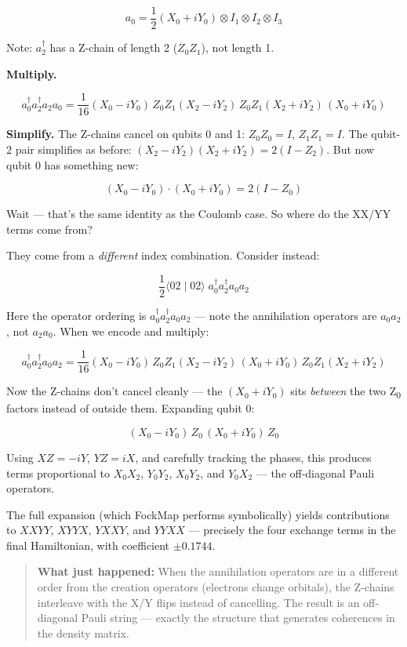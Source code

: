 \documentclass[
  11pt,
  oneside]{book}
\begin{document}
\[a_0 = \frac{1}{2}(X_0 + iY_0) \otimes I_1 \otimes I_2 \otimes I_3\]

Note: \(a_2^\dagger\) has a Z-chain of length 2 (\(Z_0 Z_1\)), not
length 1.

\textbf{Multiply.}

\[a_0^\dagger a_2^\dagger a_2 a_0 = \frac{1}{16}(X_0 - iY_0)\,Z_0 Z_1(X_2 - iY_2)\,Z_0 Z_1(X_2 + iY_2)\,(X_0 + iY_0)\]

\textbf{Simplify.} The Z-chains cancel on qubits 0 and 1:
\(Z_0 Z_0 = I\), \(Z_1 Z_1 = I\). The qubit-2 pair simplifies as before:
\((X_2 - iY_2)(X_2 + iY_2) = 2(I - Z_2)\). But now qubit 0 has something
new:

\[(X_0 - iY_0) \cdot (X_0 + iY_0) = 2(I - Z_0)\]

Wait --- that's the same identity as the Coulomb case. So where do the
XX/YY terms come from?

They come from a \emph{different} index combination. Consider instead:

\[\frac{1}{2}\langle 02 \mid 02\rangle\; a_0^\dagger a_2^\dagger a_0 a_2\]

Here the operator ordering is \(a_0^\dagger a_2^\dagger a_0 a_2\) ---
note the annihilation operators are \(a_0 a_2\), not \(a_2 a_0\). When
we encode and multiply:

\[a_0^\dagger a_2^\dagger a_0 a_2 = \frac{1}{16}(X_0 - iY_0)\,Z_0 Z_1(X_2 - iY_2)\,(X_0 + iY_0)\,Z_0 Z_1(X_2 + iY_2)\]

Now the Z-chains don't cancel cleanly --- the \((X_0 + iY_0)\) sits
\emph{between} the two Z\textsubscript{0} factors instead of outside them. Expanding
qubit 0:

\[(X_0 - iY_0)\,Z_0\,(X_0 + iY_0)\,Z_0\]

Using \(X Z = -iY\), \(Y Z = iX\), and carefully tracking the phases,
this produces terms proportional to \(X_0 X_2\), \(Y_0 Y_2\),
\(X_0 Y_2\), and \(Y_0 X_2\) --- the off-diagonal Pauli operators.

The full expansion (which FockMap performs symbolically) yields
contributions to \(XXYY\), \(XYYX\), \(YXXY\), and \(YYXX\) ---
precisely the four exchange terms in the final Hamiltonian, with
coefficient \(\pm 0.1744\).

\begin{quote}
\textbf{What just happened:} When the annihilation operators are in a
different order from the creation operators (electrons change orbitals),
the Z-chains interleave with the X/Y flips instead of cancelling. The
result is an off-diagonal Pauli string --- exactly the structure that
generates coherences in the density matrix.
\end{quote}
\end{document}
